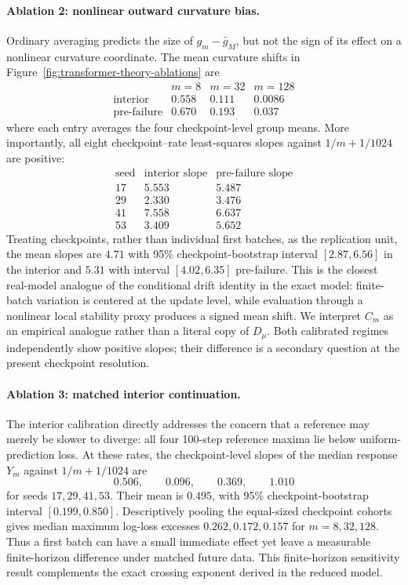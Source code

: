 \documentclass[11pt]{article}
\begin{document}
\paragraph{Ablation 2: nonlinear outward curvature bias.}
Ordinary averaging predicts the size of \(g_m-\bar g_M\), but not the sign of
its effect on a nonlinear curvature coordinate.  The mean curvature shifts
in Figure~\ref{fig:transformer-theory-ablations} are
\[
\begin{array}{c|ccc}
&m=8&m=32&m=128\\ \hline
\text{interior}&0.558&0.111&0.0086\\
\text{pre-failure}&0.670&0.193&0.037
\end{array}
\]
where each entry averages the four checkpoint-level group means.  More
importantly, all eight checkpoint--rate least-squares slopes against
\(1/m+1/1024\) are positive:
\[
\begin{array}{c|cc}
\text{seed}&\text{interior slope}&\text{pre-failure slope}\\ \hline
17&5.553&5.487\\
29&2.330&3.476\\
41&7.558&6.637\\
53&3.409&5.652
\end{array}
\]
Treating checkpoints, rather than individual first batches, as the
replication unit, the mean slopes are \(4.71\) with 95\% checkpoint-bootstrap
interval \([2.87,6.56]\) in the interior and \(5.31\) with interval
\([4.02,6.35]\) pre-failure.  This is the closest real-model analogue of the
conditional drift identity in the exact model: finite-batch variation is
centered at the update level, while evaluation through a nonlinear local
stability proxy produces a signed mean shift.  We interpret \(C_m\) as an
empirical analogue rather than a literal copy of \(D_\mu\).  Both calibrated
regimes independently show positive slopes; their difference is a secondary
question at the present checkpoint resolution.

\paragraph{Ablation 3: matched interior continuation.}
The interior calibration directly addresses the concern that a reference may
merely be slower to diverge: all four 100-step reference maxima lie below
uniform-prediction loss.  At these rates, the checkpoint-level slopes of the
median response \(Y_m\) against \(1/m+1/1024\) are
\[
  0.506,\qquad0.096,\qquad0.369,\qquad1.010
\]
for seeds \(17,29,41,53\).  Their mean is \(0.495\), with 95\%
checkpoint-bootstrap interval \([0.199,0.850]\).  Descriptively pooling the
equal-sized checkpoint cohorts gives median maximum log-loss excesses
\(0.262,0.172,0.157\) for \(m=8,32,128\).  Thus a first batch can have a
small immediate effect yet leave a measurable finite-horizon difference
under matched future data.  This finite-horizon sensitivity result
complements the exact crossing exponent derived in the reduced model.
\end{document}
